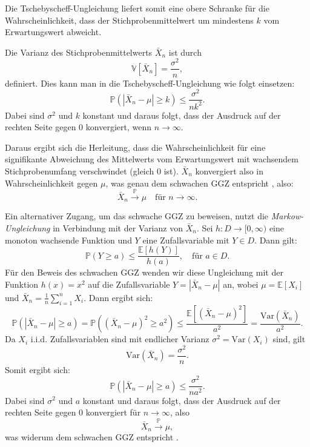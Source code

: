 \documentclass[12pt,a4paper]{article}
\begin{document}
Die Tschebyscheff-Ungleichung liefert somit eine obere Schranke für die Wahrscheinlichkeit, dass der Stichprobenmittelwert um mindestens \(k\) vom Erwartungswert abweicht.


Die Varianz des Stichprobenmittelwerts \( \bar{X}_n \) ist durch
\[
\mathbb{V}[\bar{X}_n] = \frac{\sigma^2}{n},
\]
definiert. Dies kann man in die Tschebyscheff-Ungleichung wie folgt einsetzen:
\[
\mathbb{P} \left( \left| \bar{X}_n - \mu \right| \geq k \right) \leq \frac{\sigma^2}{n k^2}.
\]
Dabei sind \(\sigma^2\) und \(k\) konstant und daraus folgt, dass der Ausdruck auf der rechten Seite gegen 0 konvergiert, wenn \(n \to \infty\). 

Daraus ergibt sich die Herleitung, dass die Wahrscheinlichkeit für eine signifikante Abweichung des Mittelwerts vom Erwartungswert mit wachsendem Stichprobenumfang verschwindet (gleich 0 ist). \(\bar{X}_n\) konvergiert also in Wahrscheinlichkeit gegen \(\mu\), was genau dem schwachen GGZ entspricht \citep{degroot2021}, also:
\[
\bar{X}_n \xrightarrow{\mathbb{P}} \mu \quad \text{für } n \to \infty.
\]


Ein alternativer Zugang, um das schwache GGZ zu beweisen, nutzt die \textit{Markow-Ungleichung} \citep{georgii2009} in Verbindung mit der Varianz von \( \bar{X}_n \). Sei \( h \colon D \to [0,\infty) \) eine monoton wachsende Funktion und \( Y \) eine Zufallsvariable mit \( Y \in D \). Dann gilt:
\[
\mathbb{P}(Y \geq a) \leq \frac{\mathbb{E}[h(Y)]}{h(a)}, \quad \text{für } a \in D.
\]
Für den Beweis des schwachen GGZ wenden wir diese Ungleichung mit der Funktion \( h(x) = x^2 \) auf die Zufallsvariable \( Y = |\bar{X}_n - \mu| \) an, wobei \( \mu = \mathbb{E}[X_i] \) und \( \bar{X}_n = \frac{1}{n} \sum_{i=1}^n X_i \). Dann ergibt sich:
\[
\mathbb{P}\left( |\bar{X}_n - \mu| \geq a \right)
= \mathbb{P}\left( (\bar{X}_n - \mu)^2 \geq a^2 \right)
\leq \frac{\mathbb{E}[(\bar{X}_n - \mu)^2]}{a^2}
= \frac{\text{Var}(\bar{X}_n)}{a^2}.
\]
Da \( X_i \) i.i.d. Zufallsvariablen sind mit endlicher Varianz \( \sigma^2 = \text{Var}(X_i) \) sind, gilt
\[
\text{Var}(\bar{X}_n) = \frac{\sigma^2}{n}.
\]
Somit ergibt sich:
\[
\mathbb{P}\left( |\bar{X}_n - \mu| \geq a \right) \leq \frac{\sigma^2}{n a^2}.
\]
Dabei sind \(\sigma^2\) und \(a\) konstant und daraus folgt, dass der Ausdruck auf der rechten Seite gegen 0 konvergiert für \( n \to \infty \), also
\[
\bar{X}_n \xrightarrow{\mathbb{P}} \mu,
\]
was widerum dem schwachen GGZ entspricht \citep{degroot2021}.
\end{document}
